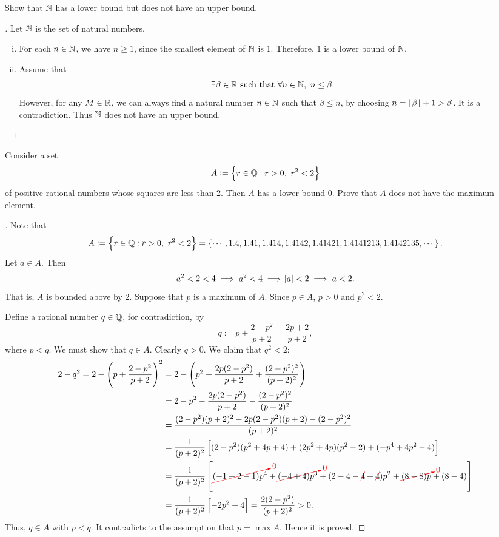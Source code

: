 \documentclass[11pt,openany]{article}
\begin{document}
\vfill
\begin{exercise*}
	Show that $\mathbb{N}$ has a lower bound but does not have an upper bound.
	\begin{proof}[\sol]
		Let $\mathbb{N}$ is the set of natural numbers. \begin{enumerate}[(i)]
			\item For each $n\in\mathbb{N}$, we have $n\geq 1$, since the smallest element of $\mathbb{N}$ is 1. Therefore, $1$ is a lower bound of $\mathbb{N}$.
			\item Assume that \[
			\exists \beta\in\mathbb{R}\ \text{such that}\ \forall n\in\mathbb{N},\ n\leq\beta.
			\]  However, for any $M\in\mathbb{R}$, we can always find a natural number $n\in\mathbb{N}$ such that $\beta\leq n$, by choosing $n=\lfloor\beta\rfloor + 1 > \beta$. It is a contradiction. Thus $\mathbb{N}$ does not have an upper bound.
		\end{enumerate}
	\end{proof}
\end{exercise*}
\begin{exercise*}[\textcolor{violet}{$\star$}]
	Consider a set \[
	A:=\set{r\in\mathbb{Q}:r>0,\ r^2<2}
	\] of positive rational numbers whose squares are less than 2. Then $A$ has a lower bound $0$. Prove that $A$ does not have the maximum element.
	\begin{proof}[\sol]
		Note that \[
		A:=\set{r\in\mathbb{Q}:r>0,\ r^2<2}=\set{\cdots,1.4, 1.41, 1.414, 1.4142, 1.41421, 1.4141213, 1.4142135, \cdots}.
		\] Let $a\in A$. Then \[
		a^2<2<4\implies a^2<4\implies\abs{a}<2\implies a < 2.
		\] That is, $A$ is bounded above by $2$. Suppose that $p$ is a maximum of $A$. Since $p\in A$, $p>0$ and $p^2<2$. 
		\begin{center}
		
		\end{center}
		Define a rational number $q\in\mathbb{Q}$, for contradiction, by \[
		q:=p + \frac{2-p^2}{p+2}=\frac{2p+2}{p+2},	
		\] where $p<q$. We must show that $q\in A$. 
		\newpage
		\noindent Clearly $q>0$. We claim that $q^2<2$: \begin{align*}
			2-q^2=2-\left(p + \frac{2-p^2}{p+2}\right)^2
			&=2-\left(p^2+\frac{2p(2-p^2)}{p+2}+\frac{(2-p^2)^2}{(p+2)^2}\right) \\
			&=2-p^2-\frac{2p(2-p^2)}{p+2}-\frac{(2-p^2)^2}{(p+2)^2} \\
			&=\frac{(2-p^2)(p+2)^2-2p(2-p^2)(p+2)-(2-p^2)^2}{(p+2)^2} \\
			&=\frac{1}{(p+2)^2}\left[(2-p^2)(p^2+4p+4)+(2p^2+4p)(p^2-2)+(-p^4+4p^2-4)\right] \\
			&=\frac{1}{(p+2)^2}\left[\crossout[red]{0}{(-1+2-1)p^4}+\crossout[red]{0}{(-4+4)p^3}+(2-4-\ncrossout[red]{4}+\ncrossout[red]{4})p^2+\crossout[red]{0}{(8-8)p}+(8-4)\right] \\
			&=\frac{1}{(p+2)^2}\left[-2p^2+4\right] =\frac{2(2-p^2)}{(p+2)^2}>0.
			\end{align*}
		Thus, $q\in A$ with $p<q$. It contradicts to the assumption that $p=\max A$. Hence it is proved.
	\end{proof}
\end{exercise*}
\end{document}
